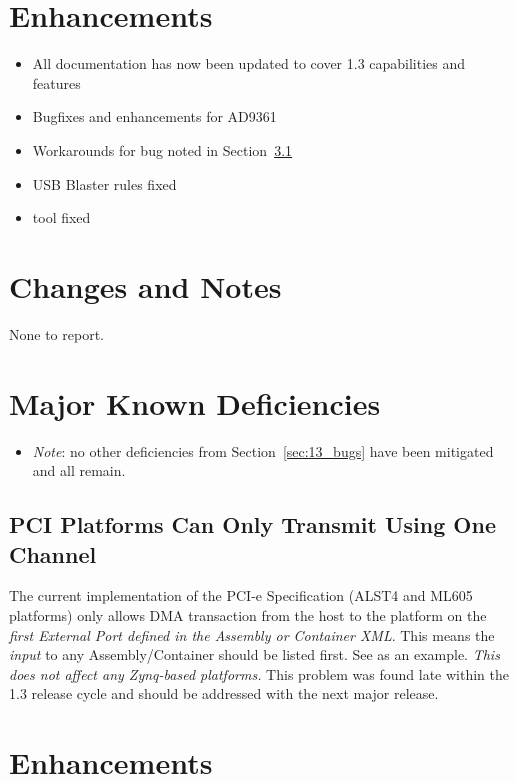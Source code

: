 \section{Enhancements}
\begin{itemize}
\item All documentation has now been updated to cover 1.3 capabilities and features
\item Bugfixes and enhancements for AD9361
\item Workarounds for bug noted in Section~\ref{bug:3783}
\item USB Blaster  rules fixed
\item {} tool fixed
\end{itemize}

\section{Changes and Notes}
None to report.
\section{Major Known Deficiencies}
\begin{itemize}
\item \textit{Note}: no other deficiencies from Section~\ref{sec:13_bugs} have been mitigated and all remain.
\end{itemize}
\subsection{PCI Platforms Can Only Transmit Using One Channel} %
\label{bug:3783}

The current implementation of the PCI-e Specification (ALST4 and ML605 platforms) only allows DMA transaction from the host to the platform on the \textit{first External Port defined in the Assembly or Container XML}. This means the \textit{input} to any Assembly/Container should be listed first. See
as an example. \textit{This does not affect any Zynq-based platforms.} This problem was found late within the 1.3 release cycle and should be addressed with the next major release.

\newpage
{}
\section{Enhancements}
\label{sec:13_enhancements}
